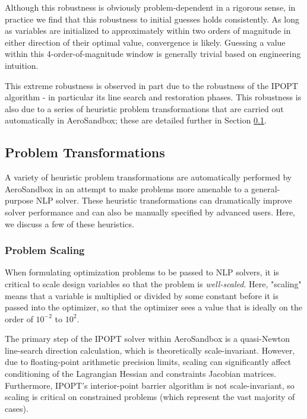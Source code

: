 Although this robustness is obviously problem-dependent in a rigorous sense, in practice we find that this robustness to initial guesses holds consistently. As long as variables are initialized to approximately within two orders of magnitude in either direction of their optimal value, convergence is likely. Guessing a value within this 4-order-of-magnitude window is generally trivial based on engineering intuition.

This extreme robustness is observed in part due to the robustness of the IPOPT algorithm - in particular its line search and restoration phases. This robustness is also due to a series of heuristic problem transformations that are carried out automatically in AeroSandbox; these are detailed further in Section \ref{sect:problem-transformations}.

\subsection{Problem Transformations}
\label{sect:problem-transformations}

A variety of heuristic problem transformations are automatically performed by AeroSandbox in an attempt to make problems more amenable to a general-purpose NLP solver. These heuristic transformations can dramatically improve solver performance and can also be manually specified by advanced users. Here, we discuss a few of these heuristics.

\subsubsection{Problem Scaling}

When formulating optimization problems to be passed to NLP solvers, it is critical to scale design variables so that the problem is \textit{well-scaled}. Here, "scaling" means that a variable is multiplied or divided by some constant before it is passed into the optimizer, so that the optimizer sees a value that is ideally on the order of $10^{-2}$ to $10^2$.

The primary step of the IPOPT solver within AeroSandbox is a quasi-Newton line-search direction calculation, which is theoretically scale-invariant. However, due to floating-point arithmetic precision limits, scaling can significantly affect conditioning of the Lagrangian Hessian and constraints Jacobian matrices. Furthermore, IPOPT's interior-point barrier algorithm is not scale-invariant, so scaling is critical on constrained problems (which represent the vast majority of cases).

